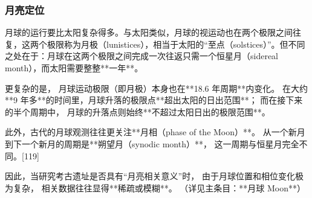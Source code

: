 \subsubsection{月亮定位}
月球的运行要比太阳复杂得多。与太阳类似，月球的视运动也在两个极限之间往复，这两个极限称为月极（lunistices），相当于太阳的“至点（solstices）”。但不同之处在于：月球在这两个极限之间完成一次往返只需一个恒星月（sidereal month），而太阳需要整整**一年**。

更复杂的是，
月球运动极限（即月极）本身也在**18.6 年周期**内变化。
在大约 **9 年多**的时间里，月球升落的极限点**超出太阳的日出范围**；
而在接下来的半个周期中，
月球的升落点则始终**不超过太阳日出的极限范围**。

此外，古代的月球观测往往更关注**月相（phase of the Moon）**。
从一个新月到下一个新月的周期是**朔望月（synodic month）**，
这一周期与恒星月完全不同。[119]

因此，当研究考古遗址是否具有“月亮相关意义”时，
由于月球位置和相位变化极为复杂，
相关数据往往显得**稀疏或模糊**。
（详见主条目：**月球 Moon**）
